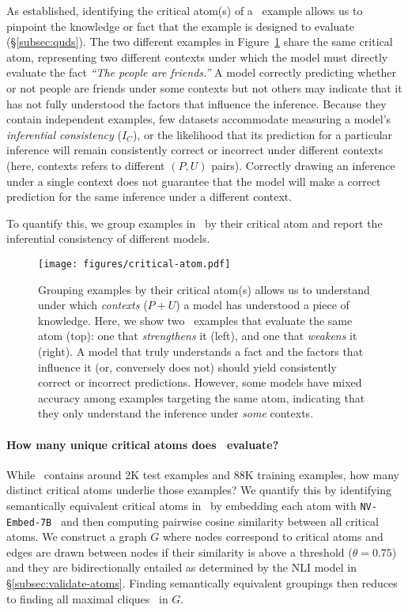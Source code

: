 As established, identifying the critical atom(s) of a \dnli~example allows us to pinpoint the knowledge or fact that the example is designed to evaluate (\S\ref{subsec:quds}).
%
The two different examples in Figure~\ref{fig:critical-atom} share the same critical atom, representing two different contexts under which the model must directly evaluate the fact \textit{``The people are friends.''}
%
A model correctly predicting whether or not people are friends under some contexts but not others may indicate that it has not fully understood the factors that influence the inference.
%
Because they contain independent examples, few datasets accommodate measuring a model's \textit{inferential consistency} ($I_C$), or the likelihood that its prediction for a particular inference will remain consistently correct or incorrect under different contexts (here, contexts refers to different $(P, U)$ pairs). 
%
Correctly drawing an inference under a single context does not guarantee that the model will make a correct prediction for the same inference under a different context.
%

To quantify this, we group examples in \dsnlitest~by their critical atom and report the inferential consistency of different models.
%


\begin{figure}[t!]
\centering
\texttt{[image: figures/critical-atom.pdf]}
\caption{Grouping examples by their critical atom(s) allows us to understand under which \textit{contexts} ($P + U$) a model has understood a piece of knowledge. Here, we show two \dnli~examples that evaluate the same atom (top): one that \textit{strengthens} it (left), and one that \textit{weakens} it (right). 
A model that truly understands a fact and the factors that influence it (or, conversely does not) should yield consistently correct or incorrect predictions. However, some models have mixed accuracy among examples targeting the same atom, indicating that they only understand the inference under \textit{some} contexts.}
\label{fig:critical-atom}
\end{figure}

%
\paragraph{How many unique critical atoms does \dsnlitest~evaluate?} While \dsnli~contains around 2K test examples and 88K training examples, how many distinct critical atoms underlie those examples? 
%
We quantify this by identifying semantically equivalent critical atoms in \dsnlitest~by embedding each atom with \texttt{NV-Embed-7B}~\cite{lee2024nv} and then computing pairwise cosine similarity between all critical atoms.
%
We construct a graph $G$ where nodes correspond to critical atoms and edges are drawn between nodes if their similarity is above a threshold ($\theta=0.75$) and they are bidirectionally entailed as determined by the NLI model in \S\ref{subsec:validate-atoms}.
%
Finding semantically equivalent groupings then reduces to finding all maximal cliques~\cite{tomita2006worst} in $G$.

